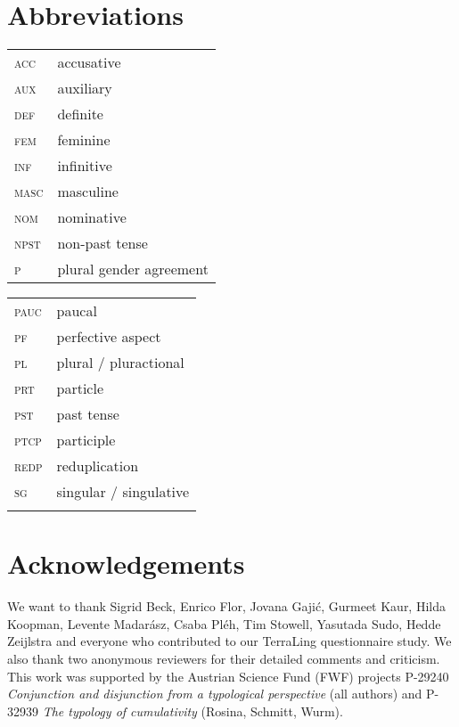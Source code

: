 \documentclass[output=paper]{langscibook}
\begin{document}
\section*{Abbreviations}
\begin{tabularx}{.45\textwidth}{lQ}
\textsc{acc} & accusative \\
\textsc{aux} & auxiliary \\
\textsc{def} & definite \\
\textsc{fem} & feminine \\
\textsc{inf} & infinitive \\
\textsc{masc} & masculine \\
\textsc{nom} & nominative \\
\textsc{npst} & non-past tense \\
\textsc{p} & plural gender agreement \\
\end{tabularx}
\begin{tabularx}{.45\textwidth}{lQ}
\textsc{pauc} & paucal \\
\textsc{pf} & perfective aspect \\
\textsc{pl} & plural / pluractional \\
\textsc{prt} & particle \\
\textsc{pst} & past tense \\
\textsc{ptcp} & participle \\
\textsc{redp} & reduplication \\
\textsc{sg} & singular / singulative \\
&\\
\end{tabularx}

\section*{Acknowledgements}
We want to thank Sigrid Beck, Enrico Flor, Jovana Gajić, Gurmeet Kaur, Hilda Koopman, Levente Madarász, Csaba Pléh, Tim Stowell, Yasutada Sudo, Hedde Zeijlstra and everyone who contributed to our TerraLing questionnaire study. We also thank two anonymous reviewers for their detailed comments and criticism. This work was supported by the Austrian Science Fund (FWF) projects P-29240 \textit{Conjunction and disjunction from a typological perspective} (all authors) and P-32939 \textit{The typology of cumulativity} (Rosina, Schmitt, Wurm).


{\sloppy\printbibliography[heading=subbibliography,notkeyword=this]}
\end{document}
